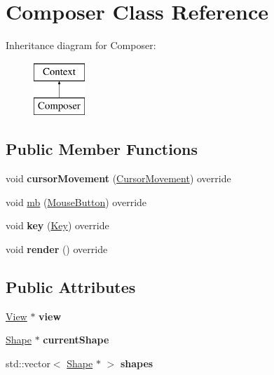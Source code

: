 \hypertarget{classComposer}{}\section{Composer Class Reference}
\label{classComposer}
Inheritance diagram for Composer\+:\begin{figure}[H]
\begin{center}
\leavevmode
\includegraphics[height=2.000000cm]{classComposer}
\end{center}
\end{figure}
\subsection*{Public Member Functions}
\begin{DoxyCompactItemize}
\item 
void {\bfseries cursor\+Movement} (\hyperlink{classCursorMovement}{Cursor\+Movement}) override\hypertarget{classComposer_a50e1533adec6e7b920d7092c1283f5b3}{}\label{classComposer_a50e1533adec6e7b920d7092c1283f5b3}

\item 
void \hyperlink{classComposer_aeccddfa85500c2e3a517058611ccca6a}{mb} (\hyperlink{classMouseButton}{Mouse\+Button}) override
\item 
void {\bfseries key} (\hyperlink{classKey}{Key}) override\hypertarget{classComposer_a7fd90a36ca6780fceb124c5770fa60f4}{}\label{classComposer_a7fd90a36ca6780fceb124c5770fa60f4}

\item 
void {\bfseries render} () override\hypertarget{classComposer_a7b26fe43793a77194d126d0244a4c25f}{}\label{classComposer_a7b26fe43793a77194d126d0244a4c25f}

\end{DoxyCompactItemize}
\subsection*{Public Attributes}
\begin{DoxyCompactItemize}
\item 
\hyperlink{classView}{View} $\ast$ {\bfseries view}\hypertarget{classComposer_a50e3d366ca34ba0ed9909e5007ec7945}{}\label{classComposer_a50e3d366ca34ba0ed9909e5007ec7945}

\item 
\hyperlink{classShape}{Shape} $\ast$ {\bfseries current\+Shape}\hypertarget{classComposer_a473d9d23e3ac014e491e811ccd7ee872}{}\label{classComposer_a473d9d23e3ac014e491e811ccd7ee872}

\item 
std\+::vector$<$ \hyperlink{classShape}{Shape} $\ast$ $>$ {\bfseries shapes}\hypertarget{classComposer_aab60ee3a7fb35ad8b4676c93f15553e1}{}\label{classComposer_aab60ee3a7fb35ad8b4676c93f15553e1}

\end{DoxyCompactItemize}


